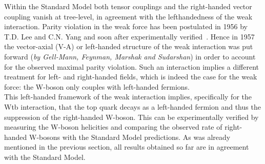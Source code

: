 Within the Standard Model both tensor couplings and the right-handed vector coupling vanish at tree-level, in agreement with the lefthandedness of the weak interaction.
Parity violation in the weak force has been postulated in 1956 by T.D. Lee and C.N. Yang and soon after experimentally verified~\cite{PViolationLeeYang, PViolationWu}. Hence in 1957 the vector-axial (V-A) or left-handed structure of the weak interaction was put forward (\textit{by Gell-Mann, Feynman, Marshak and Sudarshan}) in order to account for the observed maximal parity violation. Such an interaction implies a different treatment for left- and right-handed fields, which is indeed the case for the weak force: the W-boson only couples with left-handed fermions.
\\
This left-handed framework of the weak interaction implies, specifically for the Wtb interaction, that the top quark decays as a left-handed fermion and thus the suppression of the right-handed W-boson.
This can be experimentally verified by measuring the W-boson helicities and comparing the observed rate of right-handed W-bosons with the Standard Model predictions. As was already mentioned in the previous section, all results obtained so far are in agreement with the Standard Model.
\\


